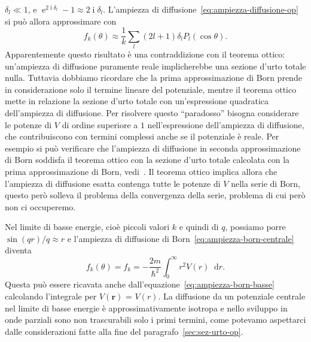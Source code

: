 \documentclass[a4paper,fleqn,twoside,12pt]{article}
\newcommand*{\dd}{\mathop{}\!\mathrm{d}} %
\DeclareMathOperator{\e}{\mathrm{e}} %
\DeclareMathOperator{\uimm}{\mathrm{i}} %
\begin{document}
$\delta_{l} \ll 1$, e $\e^{2\uimm \delta_{l}} - 1 \approx 2\uimm \delta_{l}$.
L'ampiezza di diffusione~\eqref{eq:ampiezza-diffusione-op} si può allora
approssimare con
\begin{equation}
  f_{k}(\theta) \approx \frac{1}{k}\sum_{l}(2l+1) \delta_{l} P_{l}(\cos\theta).
\end{equation}
Apparentemente questo risultato è una contraddizione con il teorema ottico:
un'ampiezza di diffusione puramente reale implicherebbe una sezione d'urto
totale nulla.  Tuttavia dobbiamo ricordare che la prima approssimazione di Born
prende in considerazione solo il termine lineare del potenziale, mentre il
teorema ottico mette in relazione la sezione d'urto totale con un'espressione
quadratica dell'ampiezza di diffusione.  Per risolvere questo ``paradosso''
bisogna considerare le potenze di $V$ di ordine superiore a $1$ nell'espressione
dell'ampiezza di diffusione, che contribuiscono con termini complessi anche se
il potenziale è reale.  Per esempio si può verificare che l'ampiezza di
diffusione in seconda approssimazione di Born soddisfa il teorema ottico con la
sezione d'urto totale calcolata con la prima approssimazione di Born,
vedi~\textcite[361-362]{gottfried:quantum-mechanics}.  Il teorema ottico implica
allora che l'ampiezza di diffusione esatta contenga tutte le potenze di $V$
nella serie di Born, questo però solleva il problema della convergenza della
serie, problema di cui però non ci occuperemo.

Nel limite di basse energie, cioè piccoli valori $k$ e quindi di $q$, possiamo
porre $\sin(qr)/q \approx r$ e l'ampiezza di diffusione di
Born~\eqref{eq:ampiezza-born-centrale} diventa
\begin{equation}
  \label{eq:ampiezza-born-centrale-basse}
  f_{k}(\theta) = f_{k} = -\frac{2m}{\hslash^{2}} \int_{0}^{\infty} r^{2}V(r)
  \dd r.
\end{equation}
Questa può essere ricavata anche dall'equazione~\eqref{eq:ampiezza-born-basse}
calcolando l'integrale per $V(\bm{r})$ = $V(r)$.  La diffusione da un potenziale
centrale nel limite di basse energie è approssimativamente isotropa e nello
sviluppo in onde parziali sono non trascurabili solo i primi termini, come
potevamo aspettarci dalle considerazioni fatte alla fine del
paragrafo~\ref{sec:sez-urto-op}.
\end{document}
